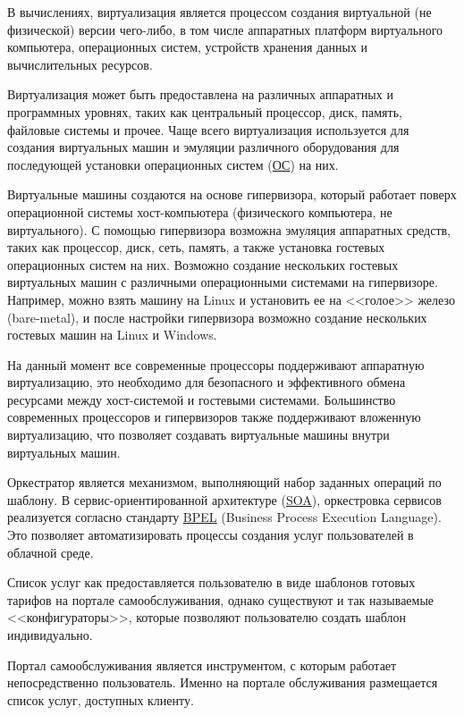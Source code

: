 
В вычислениях, виртуализация является процессом создания виртуальной (не физической) версии чего-либо, в том числе аппаратных платформ виртуального компьютера, операционных систем, устройств хранения данных и вычислительных ресурсов.

Виртуализация может быть предоставлена на различных аппаратных и программных уровнях, таких как центральный процессор, диск, память, файловые системы и прочее.
Чаще всего виртуализация используется для создания виртуальных машин и эмуляции различного оборудования для последующей установки операционных систем (\hyperlink{os}{ОС}) на них.

Виртуальные машины создаются на основе гипервизора, который работает поверх операционной системы хост-компьютера (физического компьютера, не виртуального).
С помощью гипервизора возможна эмуляция аппаратных средств, таких как процессор, диск, сеть, память, а также установка гостевых операционных систем на них.
Возможно создание нескольких гостевых виртуальных машин с различными операционными системами на гипервизоре.
Например, можно взять машину на Linux и установить ее на <<голое>> железо (bare-metal), и после настройки гипервизора возможно создание нескольких гостевых машин на Linux и Windows.

На данный момент все современные процессоры поддерживают аппаратную виртуализацию, это необходимо для безопасного и эффективного обмена ресурсами между хост-системой и гостевыми системами.
Большинство современных процессоров и гипервизоров также поддерживают вложенную виртуализацию, что позволяет создавать виртуальные машины внутри виртуальных машин.

Оркестратор является механизмом, выполняющий набор заданных операций по шаблону.
В сервис-ориентированной архитектуре (\hyperlink{soa}{SOA}), оркестровка сервисов реализуется согласно стандарту \hyperlink{bpel}{BPEL} (Business Process Execution Language).
Это позволяет автоматизировать процессы создания услуг пользователей в облачной среде.

Список услуг как предоставляется пользователю в виде шаблонов готовых тарифов на портале самообслуживания, однако существуют и так называемые <<конфигураторы>>, которые позволяют пользователю создать шаблон индивидуально.

Портал самообслуживания является инструментом, с которым работает непосредственно пользователь.
Именно на портале обслуживания размещается список услуг, доступных клиенту.

